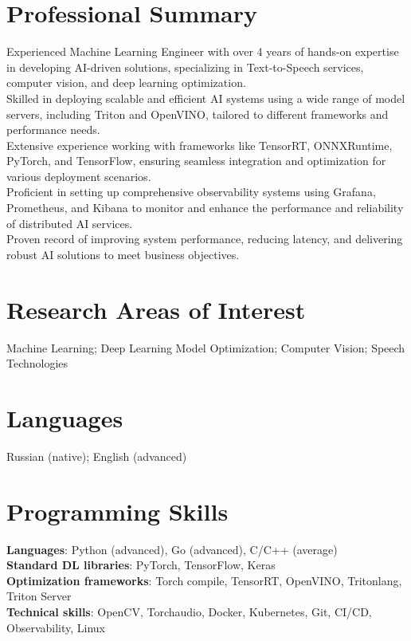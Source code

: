 \section{\sc Professional Summary}
Experienced Machine Learning Engineer with over 4 years of hands-on expertise in developing AI-driven solutions, specializing in Text-to-Speech services, computer vision, and deep learning optimization. \\
Skilled in deploying scalable and efficient AI systems using a wide range of model servers, including Triton and OpenVINO, tailored to different frameworks and performance needs. \\
Extensive experience working with frameworks like TensorRT, ONNXRuntime, PyTorch, and TensorFlow, ensuring seamless integration and optimization for various deployment scenarios. \\
Proficient in setting up comprehensive observability systems using Grafana, Prometheus, and Kibana to monitor and enhance the performance and reliability of distributed AI services. \\
Proven record of improving system performance, reducing latency, and delivering robust AI solutions to meet business objectives.

\vspace{3pt}

\section{\sc Research Areas of Interest}
{Machine Learning; Deep Learning Model Optimization; Computer Vision; Speech Technologies}

\vspace{3pt}

\section{\sc Languages}
{Russian (native); English (advanced)}

\section{\sc Programming Skills}
\textbf{Languages}: Python (advanced), Go (advanced), C/C++ (average) \\
\textbf{Standard DL libraries}: PyTorch, TensorFlow, Keras \\
\textbf{Optimization frameworks}: Torch compile, TensorRT, OpenVINO, Tritonlang, Triton Server \\
\textbf{Technical skills}: OpenCV, Torchaudio, Docker, Kubernetes, Git, CI/CD, Observability, Linux

\endinput
